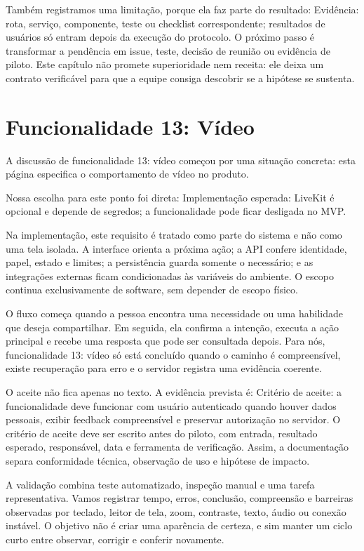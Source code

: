 \documentclass[12pt,oneside,a4paper,article]{abntex2}
\begin{document}
Também registramos uma limitação, porque ela faz parte do resultado: Evidência: rota, serviço, componente, teste ou checklist correspondente; resultados de usuários só entram depois da execução do protocolo. O próximo passo é transformar a pendência em issue, teste, decisão de reunião ou evidência de piloto. Este capítulo não promete superioridade nem receita: ele deixa um contrato verificável para que a equipe consiga descobrir se a hipótese se sustenta.

\section{Funcionalidade 13: Vídeo}
A discussão de funcionalidade 13: vídeo começou por uma situação concreta: esta página especifica o comportamento de vídeo no produto.

Nossa escolha para este ponto foi direta: Implementação esperada: LiveKit é opcional e depende de segredos; a funcionalidade pode ficar desligada no MVP.

Na implementação, este requisito é tratado como parte do sistema e não como uma tela isolada. A interface orienta a próxima ação; a API confere identidade, papel, estado e limites; a persistência guarda somente o necessário; e as integrações externas ficam condicionadas às variáveis do ambiente. O escopo continua exclusivamente de software, sem depender de escopo físico.

O fluxo começa quando a pessoa encontra uma necessidade ou uma habilidade que deseja compartilhar. Em seguida, ela confirma a intenção, executa a ação principal e recebe uma resposta que pode ser consultada depois. Para nós, funcionalidade 13: vídeo só está concluído quando o caminho é compreensível, existe recuperação para erro e o servidor registra uma evidência coerente.

O aceite não fica apenas no texto. A evidência prevista é: Critério de aceite: a funcionalidade deve funcionar com usuário autenticado quando houver dados pessoais, exibir feedback compreensível e preservar autorização no servidor. O critério de aceite deve ser escrito antes do piloto, com entrada, resultado esperado, responsável, data e ferramenta de verificação. Assim, a documentação separa conformidade técnica, observação de uso e hipótese de impacto.

A validação combina teste automatizado, inspeção manual e uma tarefa representativa. Vamos registrar tempo, erros, conclusão, compreensão e barreiras observadas por teclado, leitor de tela, zoom, contraste, texto, áudio ou conexão instável. O objetivo não é criar uma aparência de certeza, e sim manter um ciclo curto entre observar, corrigir e conferir novamente.
\end{document}
